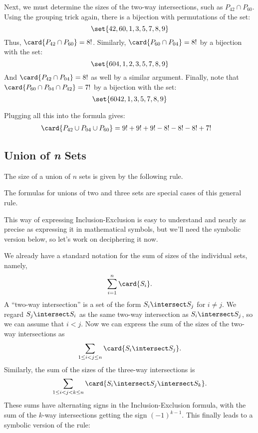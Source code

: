 Next, we must determine the sizes of the two-way intersections, such
as $P_{42} \cap P_{60}$.  Using the grouping trick again, there is a
bijection with permutations of the set:
%
\[
\set{42, 60, 1, 3, 5, 7, 8, 9}
\]
%
Thus, $\card{P_{42} \cap P_{60}} = 8!$.  Similarly, $\card{P_{60} \cap
P_{04}} = 8!$ by a bijection with the set:
%
\[
\set{604, 1, 2, 3, 5, 7, 8, 9}
\]
%
And $\card{P_{42} \cap P_{04}} = 8!$ as well by a similar argument.
Finally, note that $\card{P_{60} \cap P_{04} \cap P_{42}} = 7!$ by a
bijection with the set:
%
\[
\set{6042, 1, 3, 5, 7, 8, 9}
\]

Plugging all this into the formula gives:
%
\begin{align*}
\card{P_{42} \cup P_{04} \cup P_{60}}
    & = 9! + 9! + 9! - 8! - 8! - 8! + 7!
\end{align*}

\subsection{Union of \emph{n} Sets}

The size of a union of $n$ sets is given by the following rule.


The formulas for unions of two and three sets are special cases of this
general rule.

This way of expressing Inclusion-Exclusion is easy to understand and
nearly as precise as expressing it in mathematical symbols, but we'll need
the symbolic version below, so let's work on deciphering it now.

We already have a standard notation for the sum of sizes of the individual
sets, namely,
\[
\sum_{i=1}^n \card{S_i}.
\]
A ``two-way intersection'' is a set of the form $S_i \intersect S_j$ for
$i \neq j$.  We regard $S_j \intersect S_i$ as the same two-way
intersection as $S_i \intersect S_j$, so we can assume that $i < j$.  Now
we can express the sum of the sizes of the two-way intersections as
\[
\sum_{1\leq i < j \leq n} \card{S_i \intersect S_j}.
\]
Similarly, the sum of the sizes of the three-way intersections is
\[
\sum_{1\leq i < j < k \leq n} \card{S_i \intersect S_j \intersect S_k}.
\]
These sums have alternating signs in the Inclusion-Exclusion formula, with
the sum of the $k$-way intersections getting the sign $(-1)^{k-1}$.  This
finally leads to a symbolic version of the rule:

